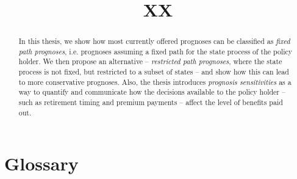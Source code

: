 \documentclass{article}
\title{XX} %
\newcommand{\1}[1]{\mathbbm{1}_{\left\lbrace #1 \right\rbrace}}
\theoremstyle{break}
\theoremstyle{remark}
\numberwithin{equation}{section}
\begin{document}
\maketitle

\begin{abstract}
	In this thesis, we show how most currently offered prognoses can be classified as \textit{fixed path prognoses}, i.e. prognoses assuming a fixed path for the state process of the policy holder. We then propose an alternative -- \textit{restricted path prognoses}, where the state process is not fixed, but restricted to a subset of states -- and show how this can lead to more conservative prognoses. Also, the thesis introduces \textit{prognosis sensitivities} as a way to quantify and communicate how the decisions available to the policy holder -- such as retirement timing and premium payments -- affect the level of benefits paid out.
\end{abstract}

\newpage

\tableofcontents 

\newpage

\section{Glossary}
\end{document}
